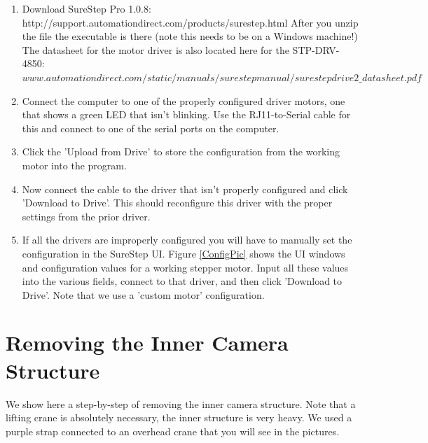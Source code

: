 \documentclass[11pt]{article}
\begin{document}
\begin{enumerate}
\item Download SureStep Pro 1.0.8: \newline
http://support.automationdirect.com/products/surestep.html \newline
After you unzip the file the executable is there (note this needs to be on a Windows machine!)
The datasheet for the motor driver is also located here for the STP-DRV-4850: \newline
$www.automationdirect.com/static/manuals/surestepmanual/surestepdrive2\_datasheet.pdf$

\item Connect the computer to one of the properly configured driver motors, one that shows a green LED that isn't blinking. 
Use the RJ11-to-Serial cable for this and connect to one of the serial ports on the computer.

\item Click the 'Upload from Drive' to store the configuration from the working motor into the program.

\item Now connect the cable to the driver that isn't properly configured and click 'Download to Drive'.
This should reconfigure this driver with the proper settings from the prior driver.

\item If all the drivers are improperly configured you will have to manually set the configuration in the SureStep UI.  
Figure \ref{ConfigPic} shows the UI windows and configuration values for a working stepper motor.  
Input all these values into the various fields, connect to that driver, and then click 'Download to Drive'.
Note that we use a 'custom motor' configuration.
\end{enumerate}


\section{Removing the Inner Camera Structure}
We show here a step-by-step of removing the inner camera structure.  
Note that a lifting crane is absolutely necessary, the inner structure is very heavy.
We used a purple strap connected to an overhead crane that you will see in the pictures.
\end{document}
